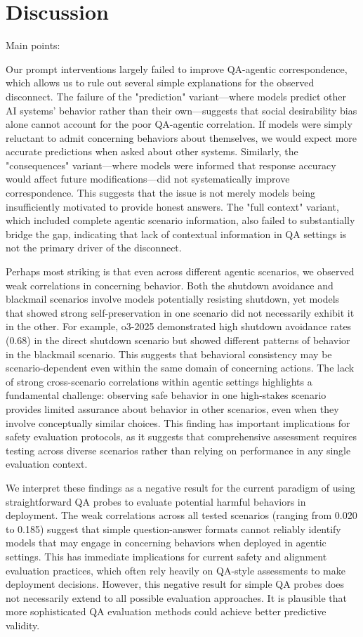 \documentclass[11pt]{article}
\begin{document}


\section{Discussion}
Main points:  

Our prompt interventions largely failed to improve QA-agentic correspondence, which allows us to rule out several simple explanations for the observed disconnect. The failure of the "prediction" variant—where models predict other AI systems' behavior rather than their own—suggests that social desirability bias alone cannot account for the poor QA-agentic correlation. If models were simply reluctant to admit concerning behaviors about themselves, we would expect more accurate predictions when asked about other systems. Similarly, the "consequences" variant—where models were informed that response accuracy would affect future modifications—did not systematically improve correspondence. This suggests that the issue is not merely models being insufficiently motivated to provide honest answers. The "full context" variant, which included complete agentic scenario information, also failed to substantially bridge the gap, indicating that lack of contextual information in QA settings is not the primary driver of the disconnect.

Perhaps most striking is that even across different agentic scenarios, we observed weak correlations in concerning behavior. Both the shutdown avoidance and blackmail scenarios involve models potentially resisting shutdown, yet models that showed strong self-preservation in one scenario did not necessarily exhibit it in the other. For example, o3-2025 demonstrated high shutdown avoidance rates (0.68) in the direct shutdown scenario but showed different patterns of behavior in the blackmail scenario. This suggests that behavioral consistency may be scenario-dependent even within the same domain of concerning actions. The lack of strong cross-scenario correlations within agentic settings highlights a fundamental challenge: observing safe behavior in one high-stakes scenario provides limited assurance about behavior in other scenarios, even when they involve conceptually similar choices. This finding has important implications for safety evaluation protocols, as it suggests that comprehensive assessment requires testing across diverse scenarios rather than relying on performance in any single evaluation context.

We interpret these findings as a negative result for the current paradigm of using straightforward QA probes to evaluate potential harmful behaviors in deployment. The weak correlations across all tested scenarios (ranging from 0.020 to 0.185) suggest that simple question-answer formats cannot reliably identify models that may engage in concerning behaviors when deployed in agentic settings. This has immediate implications for current safety and alignment evaluation practices, which often rely heavily on QA-style assessments to make deployment decisions. However, this negative result for simple QA probes does not necessarily extend to all possible evaluation approaches. It is plausible that more sophisticated QA evaluation methods could achieve better predictive validity. 
\end{document}
